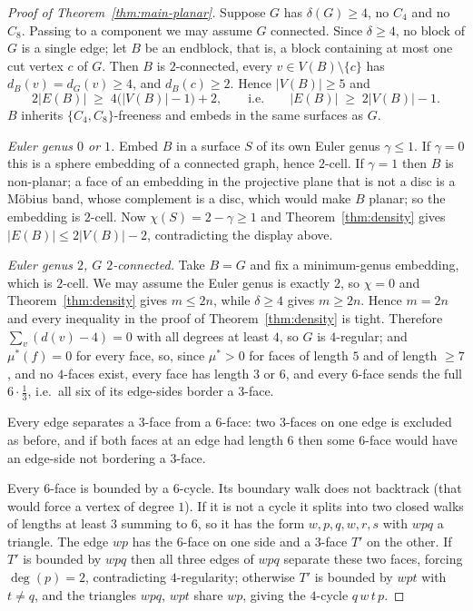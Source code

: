 \documentclass[11pt]{article}
\theoremstyle{plain}
\theoremstyle{definition}
\newcommand{\Cfour}{C_4}
\newcommand{\Ceight}{C_8}
\begin{document}
\begin{proof}[Proof of Theorem~\ref{thm:main-planar}]
Suppose $G$ has $\delta(G)\ge4$, no $\Cfour$ and no $\Ceight$. Passing to a
component we may assume $G$ connected. Since $\delta\ge4$, no block of $G$ is a
single edge; let $B$ be an endblock, that is, a block containing at most one cut
vertex $c$ of $G$. Then $B$ is $2$-connected, every $v\in V(B)\setminus\{c\}$ has
$d_B(v)=d_G(v)\ge4$, and $d_B(c)\ge2$. Hence $|V(B)|\ge5$ and
\[
  2|E(B)|\;\ge\;4\bigl(|V(B)|-1\bigr)+2,\qquad\text{i.e.}\qquad
  |E(B)|\;\ge\;2|V(B)|-1 .
\]
$B$ inherits $\{\Cfour,\Ceight\}$-freeness and embeds in the same surfaces as
$G$.

\emph{Euler genus $0$ or $1$.} Embed $B$ in a surface $S$ of its own Euler
genus $\gamma\le1$. If $\gamma=0$ this is a sphere embedding of a connected
graph, hence $2$-cell. If $\gamma=1$ then $B$ is non-planar; a face of an
embedding in the projective plane that is not a disc is a M\"obius band, whose
complement is a disc, which would make $B$ planar; so the embedding is $2$-cell.
Now $\chi(S)=2-\gamma\ge1$ and Theorem~\ref{thm:density} gives
$|E(B)|\le 2|V(B)|-2$, contradicting the display above.

\emph{Euler genus $2$, $G$ $2$-connected.} Take $B=G$ and fix a minimum-genus
embedding, which is $2$-cell. We may assume the Euler genus is exactly $2$, so
$\chi=0$ and Theorem~\ref{thm:density} gives $m\le 2n$, while $\delta\ge4$ gives
$m\ge2n$. Hence $m=2n$ and every inequality in the proof of
Theorem~\ref{thm:density} is tight. Therefore $\sum_v(d(v)-4)=0$ with all
degrees at least $4$, so $G$ is $4$-regular; and $\mu^{*}(f)=0$ for every face,
so, since $\mu^{*}>0$ for faces of length $5$ and of length $\ge7$, and no
$4$-faces exist, every face has length $3$ or $6$, and every $6$-face sends the
full $6\cdot\tfrac13$, i.e.\ all six of its edge-sides border a $3$-face.

Every edge separates a $3$-face from a $6$-face: two $3$-faces on one edge is
excluded as before, and if both faces at an edge had length $6$ then some
$6$-face would have an edge-side not bordering a $3$-face.

Every $6$-face is bounded by a $6$-cycle. Its boundary walk does not backtrack
(that would force a vertex of degree $1$). If it is not a cycle it splits into
two closed walks of lengths at least $3$ summing to $6$, so it has the form
$w,p,q,w,r,s$ with $wpq$ a triangle. The edge $wp$ has the $6$-face on one side
and a $3$-face $T'$ on the other. If $T'$ is bounded by $wpq$ then all three
edges of $wpq$ separate these two faces, forcing $\deg(p)=2$, contradicting
$4$-regularity; otherwise $T'$ is bounded by $wpt$ with $t\ne q$, and the
triangles $wpq$, $wpt$ share $wp$, giving the $4$-cycle $q\,w\,t\,p$.


\end{proof}
\end{document}
